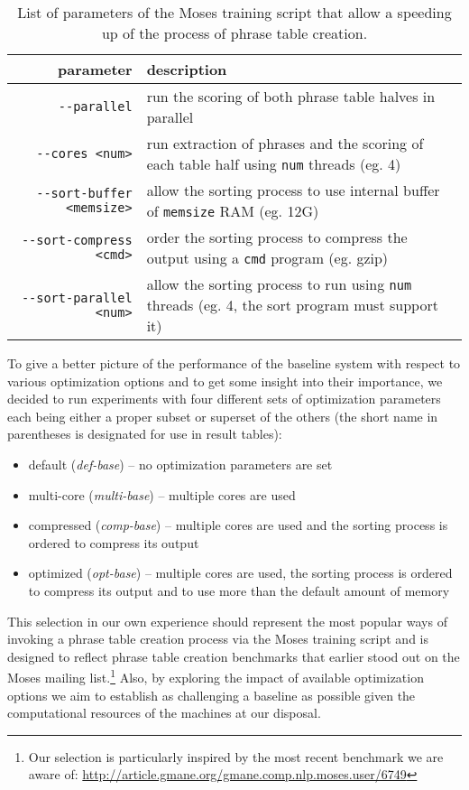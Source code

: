 \begin{table}[ht]
\centering
\begin{tabular}{ r p{86mm} }
parameter & description \\
\hline
\hline
\verb|--parallel|               & run the scoring of both phrase table halves in parallel \\
\verb|--cores <num>|            & run extraction of phrases and the scoring of each table half using \verb|num| threads (eg. 4) \\
\verb|--sort-buffer <memsize>|  & allow the sorting process to use internal buffer of \verb|memsize| RAM (eg. 12G)\\
\verb|--sort-compress <cmd>|    & order the sorting process to compress the output using a \verb|cmd| program (eg. gzip) \\
\verb|--sort-parallel <num>|    & allow the sorting process to run using \verb|num| threads (eg. 4, the sort program must support it)\\
\hline
\hline
\end{tabular}
\caption{\label{baseline-optimization-parameters}
List of parameters of the Moses training script that allow a speeding up of
the process of phrase table creation.}
\end{table}

To give a better picture of the performance of the baseline system with respect
to various optimization options and to get some insight into their importance,
we decided to run experiments with four different sets of optimization parameters
each being either a proper subset or superset of the others (the short name in
parentheses is designated for use in result tables):
\begin{itemize}
  \item default (\emph{def-base}) -- no optimization parameters are set
  \item multi-core (\emph{multi-base}) -- multiple cores are used
  \item compressed (\emph{comp-base}) -- multiple cores are used and
    the sorting process is ordered to compress its output
  \item optimized (\emph{opt-base}) -- multiple cores are used, the sorting process
    is ordered to compress its output and to use more than the default amount of memory
\end{itemize}

This selection in our own experience should represent the most popular ways of
invoking a phrase table creation process via the Moses training script and is designed to
reflect phrase table creation benchmarks that earlier stood out on the Moses mailing
list.\footnote{Our selection is particularly inspired by the most recent benchmark
we are aware of: \url{http://article.gmane.org/gmane.comp.nlp.moses.user/6749}}
Also, by exploring the impact of available optimization options we aim to establish
as challenging a baseline as possible given the computational resources of the machines
at our disposal.

